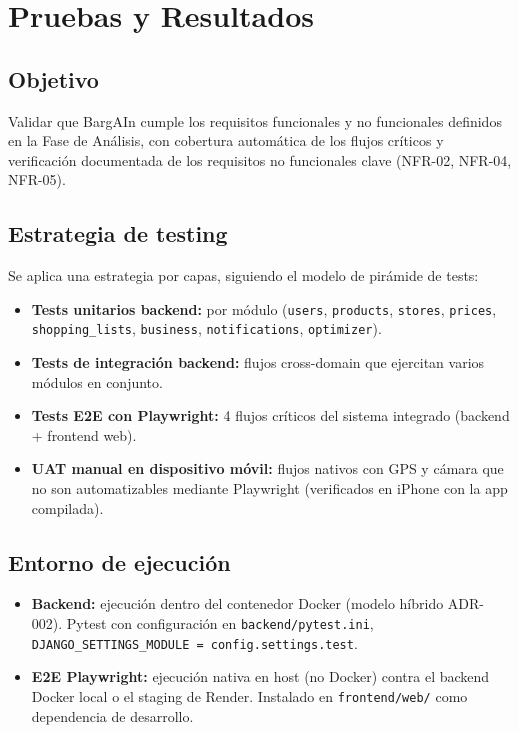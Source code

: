 
\chapter{Pruebas y Resultados}\label{cap10}

\section{Objetivo}\label{sec:pruebas-objetivo}

Validar que BargAIn cumple los requisitos funcionales y no funcionales definidos en la Fase de
An\'alisis, con cobertura autom\'atica de los flujos cr\'iticos y verificaci\'on documentada de los
requisitos no funcionales clave (NFR-02, NFR-04, NFR-05).

\section{Estrategia de testing}\label{sec:estrategia}

Se aplica una estrategia por capas, siguiendo el modelo de pir\'amide de tests:

\begin{itemize}
  \item \textbf{Tests unitarios backend:} por m\'odulo (\texttt{users}, \texttt{products},
    \texttt{stores}, \texttt{prices}, \texttt{shopping\_lists}, \texttt{business},
    \texttt{notifications}, \texttt{optimizer}).
  \item \textbf{Tests de integraci\'on backend:} flujos cross-domain que ejercitan varios m\'odulos
    en conjunto.
  \item \textbf{Tests E2E con Playwright:} 4 flujos cr\'iticos del sistema integrado
    (backend + frontend web).
  \item \textbf{UAT manual en dispositivo m\'ovil:} flujos nativos con GPS y c\'amara que no son
    automatizables mediante Playwright (verificados en iPhone con la app compilada).
\end{itemize}

\section{Entorno de ejecuci\'on}\label{sec:entorno-pruebas}

\begin{itemize}
  \item \textbf{Backend:} ejecuci\'on dentro del contenedor Docker (modelo h\'ibrido ADR-002).
    Pytest con configuraci\'on en \texttt{backend/pytest.ini},
    \texttt{DJANGO\_SETTINGS\_MODULE = config.settings.test}.
  \item \textbf{E2E Playwright:} ejecuci\'on nativa en host (no Docker) contra el backend Docker
    local o el staging de Render. Instalado en \texttt{frontend/web/} como dependencia de
    desarrollo.
\end{itemize}

